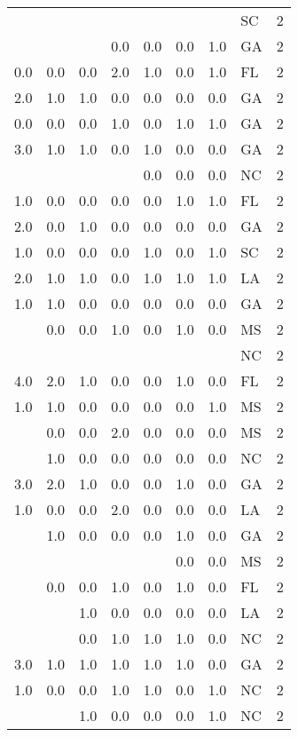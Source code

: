 \begin{tabular}{llllllllr}
    &     &     &     &     &     &     & SC &     2 \\
    &     &     & 0.0 & 0.0 & 0.0 & 1.0 & GA &     2 \\
0.0 & 0.0 & 0.0 & 2.0 & 1.0 & 0.0 & 1.0 & FL &     2 \\
2.0 & 1.0 & 1.0 & 0.0 & 0.0 & 0.0 & 0.0 & GA &     2 \\
0.0 & 0.0 & 0.0 & 1.0 & 0.0 & 1.0 & 1.0 & GA &     2 \\
3.0 & 1.0 & 1.0 & 0.0 & 1.0 & 0.0 & 0.0 & GA &     2 \\
    &     &     &     & 0.0 & 0.0 & 0.0 & NC &     2 \\
1.0 & 0.0 & 0.0 & 0.0 & 0.0 & 1.0 & 1.0 & FL &     2 \\
2.0 & 0.0 & 1.0 & 0.0 & 0.0 & 0.0 & 0.0 & GA &     2 \\
1.0 & 0.0 & 0.0 & 0.0 & 1.0 & 0.0 & 1.0 & SC &     2 \\
2.0 & 1.0 & 1.0 & 0.0 & 1.0 & 1.0 & 1.0 & LA &     2 \\
1.0 & 1.0 & 0.0 & 0.0 & 0.0 & 0.0 & 0.0 & GA &     2 \\
    & 0.0 & 0.0 & 1.0 & 0.0 & 1.0 & 0.0 & MS &     2 \\
    &     &     &     &     &     &     & NC &     2 \\
4.0 & 2.0 & 1.0 & 0.0 & 0.0 & 1.0 & 0.0 & FL &     2 \\
1.0 & 1.0 & 0.0 & 0.0 & 0.0 & 0.0 & 1.0 & MS &     2 \\
    & 0.0 & 0.0 & 2.0 & 0.0 & 0.0 & 0.0 & MS &     2 \\
    & 1.0 & 0.0 & 0.0 & 0.0 & 0.0 & 0.0 & NC &     2 \\
3.0 & 2.0 & 1.0 & 0.0 & 0.0 & 1.0 & 0.0 & GA &     2 \\
1.0 & 0.0 & 0.0 & 2.0 & 0.0 & 0.0 & 0.0 & LA &     2 \\
    & 1.0 & 0.0 & 0.0 & 0.0 & 1.0 & 0.0 & GA &     2 \\
    &     &     &     &     & 0.0 & 0.0 & MS &     2 \\
    & 0.0 & 0.0 & 1.0 & 0.0 & 1.0 & 0.0 & FL &     2 \\
    &     & 1.0 & 0.0 & 0.0 & 0.0 & 0.0 & LA &     2 \\
    &     & 0.0 & 1.0 & 1.0 & 1.0 & 0.0 & NC &     2 \\
3.0 & 1.0 & 1.0 & 1.0 & 1.0 & 1.0 & 0.0 & GA &     2 \\
1.0 & 0.0 & 0.0 & 1.0 & 1.0 & 0.0 & 1.0 & NC &     2 \\
    &     & 1.0 & 0.0 & 0.0 & 0.0 & 1.0 & NC &     2 \\

\end{tabular}
